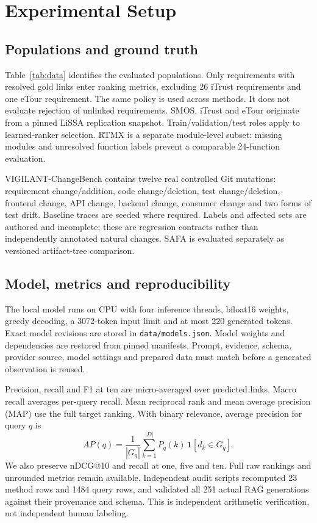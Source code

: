 \documentclass[conference,a4paper]{IEEEtran}
\begin{document}
\section{Experimental Setup}
\subsection{Populations and ground truth}
Table~\ref{tab:data} identifies the evaluated populations. Only requirements with resolved gold links enter ranking metrics, excluding 26 iTrust requirements and one eTour requirement. The same policy is used across methods. It does not evaluate rejection of unlinked requirements. SMOS, iTrust and eTour originate from a pinned LiSSA replication snapshot. Train/validation/test roles apply to learned-ranker selection. RTMX is a separate module-level subset: missing modules and unresolved function labels prevent a comparable 24-function evaluation.

VIGILANT-ChangeBench contains twelve real controlled Git mutations: requirement change/addition, code change/deletion, test change/deletion, frontend change, API change, backend change, consumer change and two forms of test drift. Baseline traces are seeded where required. Labels and affected sets are authored and incomplete; these are regression contracts rather than independently annotated natural changes. SAFA is evaluated separately as versioned artifact-tree comparison.

\subsection{Model, metrics and reproducibility}
The local model runs on CPU with four inference threads, bfloat16 weights, greedy decoding, a 3072-token input limit and at most 220 generated tokens. Exact model revisions are stored in \texttt{data/models.json}. Model weights and dependencies are restored from pinned manifests. Prompt, evidence, schema, provider source, model settings and prepared data must match before a generated observation is reused.

Precision, recall and F1 at ten are micro-averaged over predicted links. Macro recall averages per-query recall. Mean reciprocal rank and mean average precision (MAP) use the full target ranking. With binary relevance, average precision for query $q$ is
\begin{equation}
 AP(q)=\frac{1}{|G_q|}\sum_{k=1}^{|D|}P_q(k)\,\mathbf{1}[d_k\in G_q].
\end{equation}
We also preserve nDCG@10 and recall at one, five and ten. Full raw rankings and unrounded metrics remain available. Independent audit scripts recomputed 23 method rows and 1484 query rows, and validated all 251 actual RAG generations against their provenance and schema. This is independent arithmetic verification, not independent human labeling.
\end{document}
